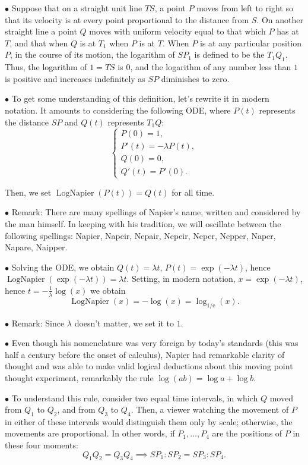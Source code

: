 \documentclass{article}
\newcommand{\e}{\mathrm{e}}
\newcommand\point[1]{\noindent \hspace{\labelsep} $\bullet$ #1 \smallskip}
\DeclareMathOperator{\lognap}{LogNapier}
\begin{document}
\point{Suppose that on a straight unit line $TS$, a point $P$ moves from left to right so that its velocity is at every point proportional to the distance from $S$. On another straight line a point $Q$ moves with uniform velocity equal to that which $P$ has at $T$, and that when $Q$ is at $T_1$ when $P$ is at $T$. When $P$ is at any particular position $P$, in the course of its motion, the logarithm of $SP_1$ is defined to be the $T_1 Q_1$. Thus, the logarithm of $1 = TS$ is $0$, and the logarithm of any number less than $1$ is positive and increases indefinitely as $SP$ diminishes to zero.}

\point{To get some understanding of this definition, let's rewrite it in modern notation. It amounts to considering the following ODE, where $P(t)$ represents the distance $SP$ and $Q(t)$ represents $T_1 Q$:
\begin{equation}
\begin{cases}
P(0) = 1,\\
P'(t) = -\lambda P(t),\\
Q(0) = 0,\\
Q'(t) = P'(0).
\end{cases}
\end{equation}

Then, we set $\lognap(P(t)) = Q(t)$ for all time.}

\point{Remark: There are many spellings of Napier's name, written and considered by the man himself. In keeping with his tradition, we will oscillate between the following spellings: Napier, Napeir, Nepair, Nepeir, Neper, Nepper, Naper, Napare, Naipper.}

\point{Solving the ODE, we obtain $Q(t) = \lambda t$, $P(t) = \exp(-\lambda t)$, hence $\lognap(\exp(-\lambda t)) = \lambda t$. Setting, in modern notation, $x = \exp(-\lambda t)$, hence $t = -\frac1\lambda \log(x)$ we obtain
\begin{equation}
\lognap(x) = -\log(x) = \log_{1/\e}(x).
\end{equation}}

\point{Remark: Since $\lambda$ doesn't matter, we set it to $1$.}

\point{Even though his nomenclature was very foreign by today's standards (this was half a century before the onset of calculus), Napier had remarkable clarity of thought and was able to make valid logical deductions about this moving point thought experiment, remarkably the rule $\log(ab) = \log a + \log b$.}

\point{To understand this rule, consider two equal time intervals, in which $Q$ moved from $Q_1$ to $Q_2$, and from $Q_3$ to $Q_4$. Then, a viewer watching the movement of $P$ in either of these intervals would distinguish them only by scale; otherwise, the movements are proportional. In other words, if $P_1, \dots, P_4$ are the positions of $P$ in these four moments:
\begin{equation}
Q_1 Q_2 = Q_3 Q_4 \implies SP_1 : SP_2 = SP_3 : SP_4.
\end{equation}}
\end{document}
